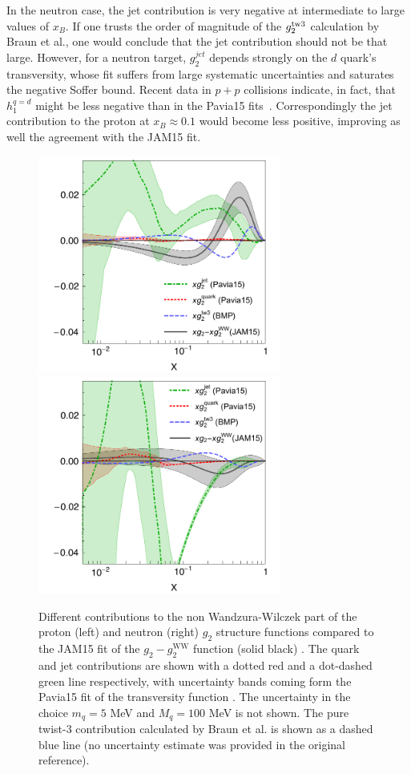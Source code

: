 \documentclass[preprintnumbers,floatfix,nofootinbib]{revtex4}
\newcommand{\xbj}{{x_B}}                   %
\newcommand{\mj}{M_q}
\begin{document}
In the neutron case, the jet contribution is very negative at intermediate to
large values of $\xbj$. 
If one trusts the order of magnitude of the $g_2^{\rm tw3}$
calculation by Braun et al., one would conclude that the jet contribution
should not be that large. However, for a neutron target, $g_2^{jet}$ depends strongly on the $d$ quark's transversity, whose fit suffers from large systematic uncertainties and saturates the negative Soffer bound. Recent data in $p+p$ collisions indicate, in fact, that $h_1^{q=d}$ might be less negative than in the Pavia15 fits~\cite{Radici:2016lam}.
Correspondingly the jet contribution to the proton at $\xbj \approx 0.1$
would become less positive, improving as well the agreement with the JAM15
fit. 

\begin{figure}[htb]
\begin{center}
\includegraphics[width=8cm]{g2contrib}
\includegraphics[width=8cm]{g2contribN}
\caption{\label{f:g2contrib} 
Different contributions to the non Wandzura-Wilczek part of the proton (left)
and neutron (right) $g_2$ structure functions compared to the JAM15 fit of the
$g_2-g_2^{\text{WW}}$ function (solid black) \cite{Sato:2016tuz}. The quark and jet
contributions are shown with a dotted red and a dot-dashed green line
respectively, with uncertainty bands coming form the Pavia15 fit of the
transversity function \cite{Radici:2015mwa}. The uncertainty in the choice
$m_q=5$ MeV and $\mj=100$ MeV is not shown. The pure twist-3 contribution
calculated by Braun et al. \cite{Braun:2011aw} is shown as a dashed blue line
(no uncertainty estimate was provided in the original reference). 
}
\end{center}
\end{figure}
\end{document}
